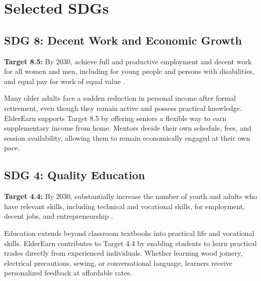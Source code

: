\documentclass[12pt,a4paper]{report}
\begin{document}
\section{Selected SDGs}

\subsection{SDG 8: Decent Work and Economic Growth}
\textbf{Target 8.5:} By 2030, achieve full and productive employment and decent work for all women and men, including for young people and persons with disabilities, and equal pay for work of equal value \cite{unsdg}.

Many older adults face a sudden reduction in personal income after formal retirement, even though they remain active and possess practical knowledge. ElderEarn supports Target 8.5 by offering seniors a flexible way to earn supplementary income from home. Mentors decide their own schedule, fees, and session availability, allowing them to remain economically engaged at their own pace.

\subsection{SDG 4: Quality Education}
\textbf{Target 4.4:} By 2030, substantially increase the number of youth and adults who have relevant skills, including technical and vocational skills, for employment, decent jobs, and entrepreneurship \cite{unsdg}.

Education extends beyond classroom textbooks into practical life and vocational skills. ElderEarn contributes to Target 4.4 by enabling students to learn practical trades directly from experienced individuals. Whether learning wood joinery, electrical precautions, sewing, or conversational language, learners receive personalized feedback at affordable rates.
\end{document}
